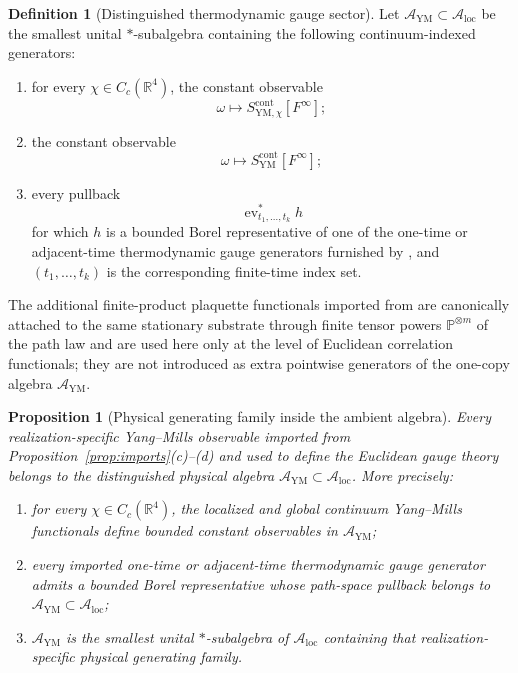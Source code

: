 \documentclass[11pt]{article}
\newtheorem{proposition}[theorem]{Proposition}
\theoremstyle{definition}
\newtheorem{definition}[theorem]{Definition}
\theoremstyle{remark}
\newcommand{\R}{\mathbb R}
\newcommand{\mcA}{\mathcal A}
\begin{document}
\begin{definition}[Distinguished thermodynamic gauge sector]
\label{def:gauge-sector}
Let \(\mcA_{\mathrm{YM}}\subset\mcA_{\mathrm{loc}}\) be the smallest unital
\(*\)-subalgebra containing the following continuum-indexed generators:
\begin{enumerate}[label=\textnormal{(\roman*)},leftmargin=1.5em]
\item for every \(\chi\in C_c(\R^4)\), the constant observable
\[
\omega\longmapsto S_{\mathrm{YM},\chi}^{\mathrm{cont}}[F^\infty];
\]
\item the constant observable
\[
\omega\longmapsto S_{\mathrm{YM}}^{\mathrm{cont}}[F^\infty];
\]
\item every pullback
\[
\operatorname{ev}_{t_1,\dots,t_k}^*h
\]
for which \(h\) is a bounded Borel representative of one of the one-time or
adjacent-time thermodynamic gauge generators furnished by
\cite{continuumqft}, and \((t_1,\dots,t_k)\) is the corresponding finite-time
index set.
\end{enumerate}
The additional finite-product plaquette functionals imported from
\cite{continuumqft} are canonically attached to the same stationary substrate
through finite tensor powers \(\mathbb P^{\otimes m}\) of the path law and are
used here only at the level of Euclidean correlation functionals; they are not
introduced as extra pointwise generators of the one-copy algebra
\(\mcA_{\mathrm{YM}}\).
\end{definition}

\begin{proposition}[Physical generating family inside the ambient algebra]
\label{prop:physical-generators}
Every realization-specific Yang--Mills observable imported from
Proposition~\ref{prop:imports}\textnormal{(c)--(d)} and used to define the
Euclidean gauge theory belongs to the distinguished physical algebra
\(\mcA_{\mathrm{YM}}\subset\mcA_{\mathrm{loc}}\).  More precisely:
\begin{enumerate}[label=\textnormal{(\roman*)},leftmargin=1.5em]
\item for every \(\chi\in C_c(\R^4)\), the localized and global continuum
Yang--Mills functionals define bounded constant observables in
\(\mcA_{\mathrm{YM}}\);
\item every imported one-time or adjacent-time thermodynamic gauge generator
admits a bounded Borel representative whose path-space pullback belongs to
\(\mcA_{\mathrm{YM}}\subset\mcA_{\mathrm{loc}}\);
\item \(\mcA_{\mathrm{YM}}\) is the smallest unital \( * \)-subalgebra of
\(\mcA_{\mathrm{loc}}\) containing that realization-specific physical
generating family.
\end{enumerate}
\end{proposition}
\end{document}
